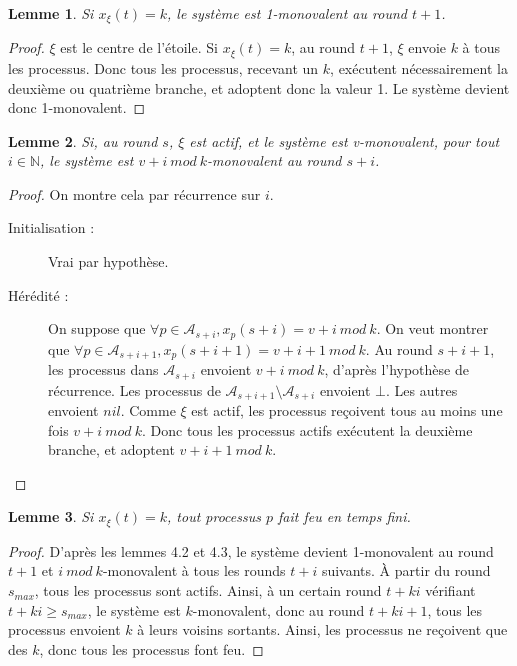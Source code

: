\documentclass{article}
\newtheorem{lemma}{Lemme}[section]
\begin{document}
\begin{lemma}
	Si $x_\xi(t) = k$, le système est 1-monovalent au round $t+1$.
\end{lemma}
\begin{proof}
	$\xi$ est le centre de l'étoile.
	Si $x_\xi(t) = k$, au round $t+1$, $\xi$ envoie $k$ à tous les processus. Donc tous les processus, recevant un $k$, exécutent nécessairement la deuxième ou quatrième branche,
	et adoptent donc la valeur 1. Le système devient donc 1-monovalent.
\end{proof}

\begin{lemma}
	Si, au round $s$, $\xi$ est actif, et le système est v-monovalent, pour tout $i \in \mathds{N}$, le système est $v+i~mod~k$-monovalent au round $s+i$.
\end{lemma}
\begin{proof}
	On montre cela par récurrence sur $i$.
	\begin{description}
		\item[Initialisation :] Vrai par hypothèse.
		\item[Hérédité :] On suppose que $\forall p \in \mathcal{A}_{s+i}, x_p(s+i) = v+i~mod~k$.
			On veut montrer que $\forall p \in \mathcal{A}_{s+i+1}, x_p(s+i+1) = v+i+1~mod~k$.
			Au round $s+i+1$, les processus dans $\mathcal{A}_{s+i}$ envoient $v+i~mod~k$, d'après l'hypothèse de récurrence.
			Les processus de $\mathcal{A}_{s+i+1} \setminus \mathcal{A}_{s+i}$ envoient $\bot$. Les autres envoient $nil$.
			Comme $\xi$ est actif, les processus reçoivent tous au moins une fois $v+i~mod~k$. Donc tous les processus actifs exécutent la deuxième branche, et adoptent $v+i+1~mod~k$.
	\end{description}
\end{proof}

\begin{lemma}
	Si $x_\xi(t) = k$, tout processus $p$ fait feu en temps fini.
\end{lemma}
\begin{proof}
	D'après les lemmes 4.2 et 4.3, le système devient 1-monovalent au round $t+1$ et $i~mod~k$-monovalent à tous les rounds $t+i$ suivants.
	À partir du round $s_{max}$, tous les processus sont actifs.
	Ainsi, à un certain round $t+k i$ vérifiant $t+k i \geq s_{max}$, le système est $k$-monovalent, donc au round $t+k i +1$, tous les processus envoient $k$ à leurs voisins sortants.
	Ainsi, les processus ne reçoivent que des $k$, donc tous les processus font feu.
\end{proof}
\end{document}
